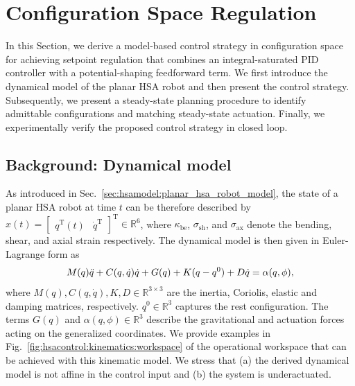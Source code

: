 \section{Configuration Space Regulation}\label{sec:hsacontrol:configuration_space_regulation}
In this Section, we derive a model-based control strategy in configuration space for achieving setpoint regulation that combines an integral-saturated PID controller with a potential-shaping feedforward term. We first introduce the dynamical model of the planar \gls{HSA} robot and then present the control strategy.
Subsequently, we present a steady-state planning procedure to identify admittable configurations and matching steady-state actuation.
Finally, we experimentally verify the proposed control strategy in closed loop.

\subsection{Background: Dynamical model}\label{sub:hsacontrol:model}
As introduced in Sec.~\ref{sec:hsamodel:planar_hsa_robot_model}, the state of a planar \gls{HSA} robot at time $t$ can be therefore described by $x(t) = \begin{bmatrix}
    q^\mathrm{T}(t) & \dot{q}^\mathrm{T}
\end{bmatrix}^\mathrm{T} \in \mathbb{R}^6$, where $\kappa_\mathrm{be}$, $\sigma_\mathrm{sh}$, and $\sigma_\mathrm{ax}$ denote the bending, shear, and axial strain respectively.
The dynamical model is then given in Euler-Lagrange form as
\begin{equation}\label{eq:hsacontrol:dynamics}
    M(q) \Ddot{q} + C(q,\dot{q})\dot{q} + G(q) + K (q - q^0) + D \dot{q} = \alpha(q,\phi),
\end{equation}
where $M(q),C(q,\dot{q}),K,D \in \mathbb{R}^{3 \times 3}$ are the inertia, Coriolis, elastic and damping matrices, respectively. $q^0 \in \mathbb{R}^3$ captures the rest configuration. The terms $G(q)$ and $\alpha(q,\phi) \in \mathbb{R}^3$ describe the gravitational and actuation forces acting on the generalized coordinates.
We provide examples in Fig.~\ref{fig:hsacontrol:kinematics:workspace} of the operational workspace that can be achieved with this kinematic model.
We stress that (a) the derived dynamical model is not affine in the control input and (b) the system is underactuated.

